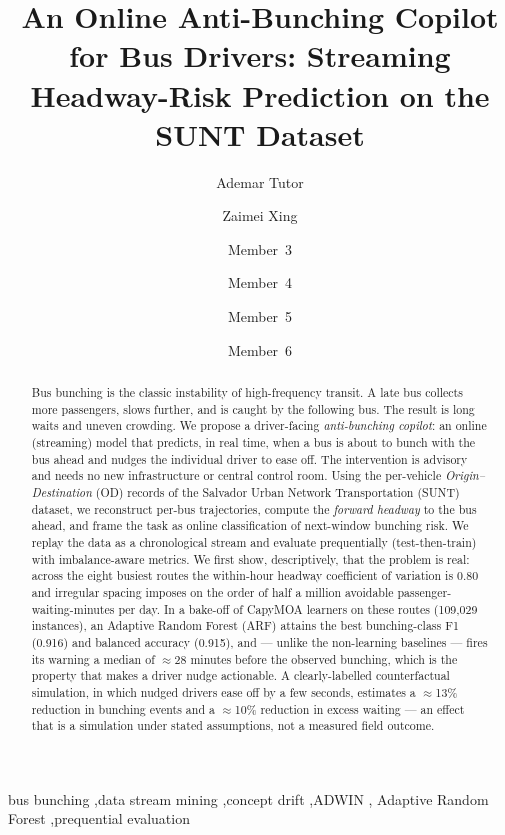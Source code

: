 \documentclass[final,5p,times,twocolumn,authoryear]{elsarticle}
\begin{document}
\begin{frontmatter}

\title{An Online Anti-Bunching Copilot for Bus Drivers:
Streaming Headway-Risk Prediction on the SUNT Dataset}

\author[uow]{Ademar Tutor}
\author[uow]{Zaimei Xing}
\author[uow]{Member~3}
\author[uow]{Member~4}
\author[uow]{Member~5}
\author[uow]{Member~6}


\begin{abstract}
Bus bunching is the classic instability of high-frequency transit. A late bus collects
more passengers, slows further, and is caught by the following bus. The result is long
waits and uneven crowding. We propose a driver-facing
\emph{anti-bunching copilot}: an online (streaming) model that predicts, in real time,
when a bus is about to bunch with the bus ahead and nudges the individual driver to ease
off. The intervention is advisory and needs no new infrastructure or central control room.
Using the per-vehicle \emph{Origin--Destination} (OD) records of the Salvador Urban Network
Transportation (SUNT) dataset, we reconstruct per-bus trajectories, compute the
\emph{forward headway} to the bus ahead, and frame the task as online classification of
next-window bunching risk. We replay the data as a chronological stream and evaluate
prequentially (test-then-train) with imbalance-aware metrics. We first show, descriptively,
that the problem is real: across the eight busiest routes the within-hour headway coefficient
of variation is $0.80$ and irregular spacing imposes on the order of half a million avoidable
passenger-waiting-minutes per day. In a bake-off of CapyMOA learners on these routes
(109{,}029 instances), an Adaptive Random Forest (ARF) attains the best bunching-class F1
(0.916) and balanced accuracy (0.915), and --- unlike the non-learning baselines --- fires its
warning a median of $\approx$28 minutes before the observed bunching, which is the property
that makes a driver nudge actionable. A clearly-labelled counterfactual simulation, in which
nudged drivers ease off by a few seconds, estimates a $\approx$13\% reduction in bunching
events and a $\approx$10\% reduction in excess waiting --- an effect that is a simulation under
stated assumptions, not a measured field outcome.
\end{abstract}

\begin{keyword}
bus bunching \sep data stream mining \sep concept drift \sep ADWIN \sep
Adaptive Random Forest \sep prequential evaluation
\end{keyword}

\end{frontmatter}
\end{document}
